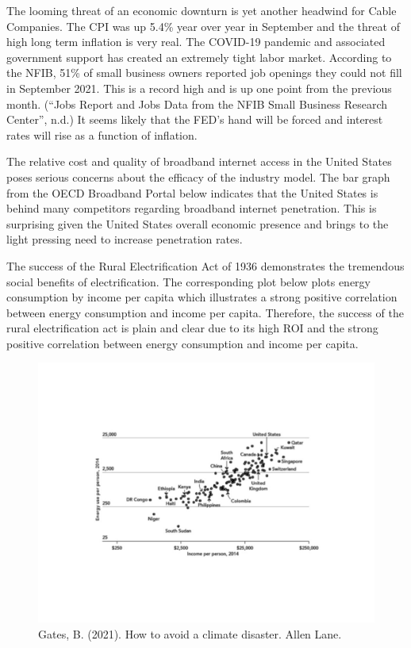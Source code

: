 \documentclass[a4paper,oneside]{article}
\begin{document}
	The looming threat of an economic downturn is yet another headwind for Cable
	Companies. The CPI was up 5.4\% year over year in September and the threat of high long term
	inflation is very real. The COVID-19 pandemic and associated government support has created
	an extremely tight labor market. According to the NFIB, 51\% of small business owners reported
	job openings they could not fill in September 2021. This is a record high and is up one point
	from the previous month. (“Jobs Report and Jobs Data from the NFIB Small Business Research
	Center”, n.d.) It seems likely that the FED's hand will be forced and interest rates will rise as a
	function of inflation.

	The relative cost and quality of broadband internet access in the United States poses
	serious concerns about the efficacy of the industry model. The bar graph from the OECD
	Broadband Portal below indicates that the United States is behind many competitors regarding
	broadband internet penetration. This is surprising given the United States overall economic
	presence and brings to the light pressing need to increase penetration rates.

	The success of the Rural Electrification Act of 1936 demonstrates the tremendous social benefits of electrification. 
	The corresponding plot below plots energy consumption by income per capita which illustrates a strong positive correlation between energy consumption and income per capita. 
	Therefore, the success of the rural electrification act is plain and clear due to its high ROI and the strong positive correlation between energy consumption and income per capita. 
	\begin{figure}
		\includegraphics[width=\columnwidth]{img/GATES}
		\caption{Gates, B. (2021). How to avoid a climate disaster. Allen Lane.}
	\end{figure}
\end{document}
